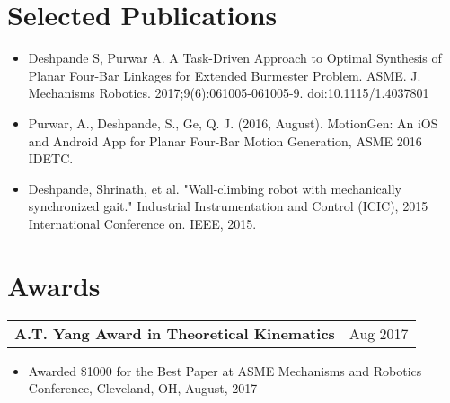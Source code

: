 \documentclass[letterpaper,10pt]{article}
\makeatletter
\newcommand{\resumeSubheadingWithDate}[2]{
    \begin{tabular*}{0.97\textwidth}{l@{\extracolsep{\fill}}r}
      \small\textbf{#1} & \small #2 \\
    \end{tabular*}
    \vspace{+2pt}
}
\newcommand{\resumeSection}[1]{
\vspace{-12pt}
\section{\textbf{#1}}
}
\newcommand{\resumeItemListStart}{
\vspace{-7pt}
\begin{itemize}[leftmargin=14pt]
}
\newcommand{\resumeItemListEnd}{
\vspace{+7pt}
\end{itemize}
}
\newcommand{\resumeItem}[1]{
  \item\small{
      {#1 \vspace{-7pt}
      }
  }
}
\makeatother
\begin{document}
\resumeSection{Selected Publications}
\vspace{+7pt}
    \resumeItemListStart
      \resumeItem{Deshpande S, Purwar A. A Task-Driven Approach to Optimal Synthesis of Planar Four-Bar Linkages for Extended Burmester Problem. ASME. J. Mechanisms Robotics. 2017;9(6):061005-061005-9. doi:10.1115/1.4037801}
      \resumeItem{Purwar, A., Deshpande, S., Ge, Q. J. (2016, August). MotionGen: An iOS and Android App for Planar Four-Bar Motion Generation, ASME 2016 IDETC.}
      \resumeItem{Deshpande, Shrinath, et al. "Wall-climbing robot with mechanically synchronized gait." Industrial Instrumentation and Control (ICIC), 2015 International Conference on. IEEE, 2015.}
    \resumeItemListEnd

\resumeSection{Awards}
    \resumeSubheadingWithDate{A.T. Yang Award in Theoretical Kinematics}{Aug 2017}
    \resumeItemListStart
      \resumeItem{Awarded \$1000 for the Best Paper at ASME Mechanisms and Robotics Conference, Cleveland, OH, August, 2017}
    \resumeItemListEnd
\end{document}

